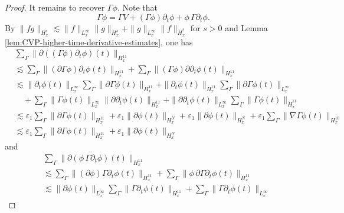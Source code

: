 \documentclass[11pt,twoside]{article}
\def\p{\partial}
\def\ve{\varepsilon}
\def\ls{\lesssim}
\theoremstyle{plain}
\theoremstyle{definition}
\theoremstyle{assumption}
\numberwithin{equation}{section}
\begin{document}
\begin{proof}
		
		
		
		It remains to recover \(\Gamma\phi\).
        Note that
		\begin{equation}
			\label{eq:CVP-Gamma-recovery-identity}
			\Gamma\phi
			=
			\Gamma V
			+
			(\Gamma\phi)\p_t\phi
			+
			\phi\,\Gamma\p_t\phi.
		\end{equation}
		By $\|fg\|_{H^s_x}\ls\|f\|_{L^\infty_x}\|g\|_{H^s_x}
		+\|g\|_{L^\infty_x}\|f\|_{\dot H^s_x}
		$ for $s> 0 $ and Lemma \ref{lem:CVP-higher-time-derivative-estimates},
        one has
		\begin{equation}
			\label{eq:CVP-recovery-first-term}
			\begin{aligned}
				&
				\sum_{\Gamma}
				\|\p((\Gamma\phi)\p_t\phi)(t)\|_{H^{11}_x}
				\\
				&\ls
				\sum_{\Gamma}
				\|(\p\Gamma\phi)\p_t\phi(t)\|_{H^{11}_x}
				+
				\sum_{\Gamma}
				\|(\Gamma\phi)\p\p_t\phi(t)\|_{H^{11}_x}
				\\
				&\ls
				\|\p_t\phi(t)\|_{L^{\infty}_x}
				\sum_{\Gamma}
				\|\p\Gamma\phi(t)\|_{H^{11}_x}
				+
				\|\p_t\phi(t)\|_{H^{11}_x}
				\sum_{\Gamma}
				\|\p\Gamma\phi(t)\|_{L^{\infty}_x}
				\\
				&\quad+
				\sum_{\Gamma}
				\|\Gamma\phi(t)\|_{L^\infty_x}
				\|\p\p_t\phi(t)\|_{H^{11}_x}
				+
				\|\p\p_t\phi(t)\|_{L^{\infty}_x}
				\sum_{\Gamma}
				\|\Gamma\phi(t)\|_{\dot{H}^{11}_x}
				\\
				&\ls
				\ve_1
				\sum_{\Gamma}
				\|\p\Gamma\phi(t)\|_{H^{11}_x}
				+
				\ve_1
				\|\p\phi(t)\|_{H^N_x}
				+
				\ve_1
				\|\p\phi(t)\|_{H^N_x}
				+
				\ve_1
				\sum_{\Gamma}
				\|\nabla\Gamma\phi(t)\|_{H^{10}_x}
				\\
				&\ls
				\ve_1
				\sum_{\Gamma}
				\|\p\Gamma\phi(t)\|_{H^{11}_x}
				+
				\ve_1
				\|\p\phi(t)\|_{H^N_x}
			\end{aligned}
		\end{equation}
		and
		\begin{equation}
			\label{eq:CVP-recovery-second-term-1}
			\begin{aligned}
				&
				\sum_{\Gamma}
				\|\p(\phi\,\Gamma\p_t\phi)(t)\|_{H^{11}_x}
				\\
				&\ls
				\sum_{\Gamma}
				\|(\p\phi)\Gamma\p_t\phi(t)\|_{H^{11}_x}
				+
				\sum_{\Gamma}
				\|\phi\,\p\Gamma\p_t\phi(t)\|_{H^{11}_x}
				\\
				&\ls
				\|\p\phi(t)\|_{L^\infty_x}
				\sum_{\Gamma}
				\|\Gamma\p_t\phi(t)\|_{H^{11}_x}
				+
				\sum_{\Gamma}
				\|\Gamma\p_t\phi(t)\|_{L^\infty_x}

\end{aligned}
\end{equation}
\end{proof}
\end{document}
